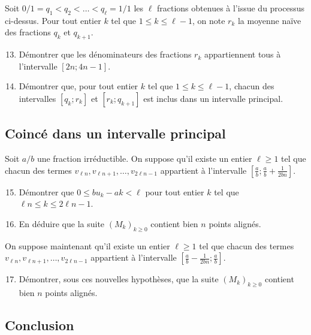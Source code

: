 \documentclass[landscape,twocolumn,leqno,a4paper,10pt]{report} %
\newcommand\n{\noindent}
\renewcommand{\geq}{\geqslant}
\renewcommand{\leq}{\leqslant}
\begin{document}
\n Soit $0 / 1=q_{1}<q_{2}<\ldots<q_{\ell}=1 / 1$ les $\ell$ fractions obtenues à l'issue du processus ci-dessus. Pour tout entier $k$ tel que $1 \leq k \leq \ell-1$, on note $r_{k}$ la moyenne naïve des fractions $q_{k}$ et $q_{k+1}$.

\begin{enumerate}\setcounter{enumi}{12}
	\item Démontrer que les dénominateurs des fractions $r_{k}$ appartiennent tous à l'intervalle $[2 n ; 4 n-1]$.
	\item Démontrer que, pour tout entier $k$ tel que $1 \leq k \leq \ell-1$, chacun des intervalles $\left[q_{k} ; r_{k}\right]$ et $\left[r_{k} ; q_{k+1}\right]$ est inclus dans un intervalle principal.
\end{enumerate}


\subsection{Coincé dans un intervalle principal}


\n Soit $a / b$ une fraction irréductible. On suppose qu'il existe un entier $\ell \geq 1$ tel que chacun des termes $v_{\ell n}, v_{\ell n+1}, \ldots, v_{2 \ell n-1}$ appartient à l'intervalle $\left[\frac{a}{b} ; \frac{a}{b}+\frac{1}{2 b n}\right]$.
\begin{enumerate}\setcounter{enumi}{14}
	\item Démontrer que $0 \leq b u_{k}-a k<\ell$ pour tout entier $k$ tel que $\ell n \leq k \leq 2 \ell n-1$.
	\item En déduire que la suite $\left(M_{k}\right)_{k \geq 0}$ contient bien $n$ points alignés.
\end{enumerate}

\n On suppose maintenant qu'il existe un entier $\ell \geq 1$ tel que chacun des termes $v_{\ell n}, v_{\ell n+1}, \ldots, v_{2 \ell n-1}$ appartient à l'intervalle $\left[\frac{a}{b}-\frac{1}{2 b n} ; \frac{a}{b}\right]$.

\begin{enumerate}\setcounter{enumi}{16}	
	\item Démontrer, sous ces nouvelles hypothèses, que la suite $\left(M_{k}\right)_{k \geq 0}$ contient bien $n$ points alignés.
\end{enumerate}


\subsection{Conclusion}
\end{document}
